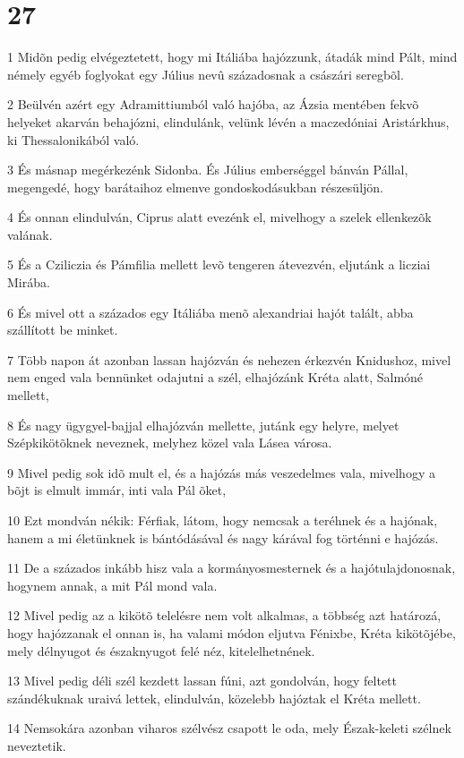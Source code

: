 \chapter{27}

\par 1 Midõn pedig elvégeztetett, hogy mi Itáliába hajózzunk, átadák mind Pált, mind némely egyéb foglyokat egy Július nevû századosnak a császári seregbõl.
\par 2 Beülvén azért egy Adramittiumból való hajóba, az Ázsia mentében fekvõ helyeket akarván behajózni, elindulánk, velünk lévén a maczedóniai Aristárkhus, ki Thessalonikából való.
\par 3 És másnap megérkezénk Sidonba. És Július emberséggel bánván Pállal, megengedé, hogy barátaihoz elmenve gondoskodásukban részesüljön.
\par 4 És onnan elindulván, Ciprus alatt evezénk el, mivelhogy a szelek ellenkezõk valának.
\par 5 És a Cziliczia és Pámfilia mellett levõ tengeren átevezvén, eljutánk a licziai Mirába.
\par 6 És mivel ott a százados egy Itáliába menõ alexandriai hajót talált, abba szállított be minket.
\par 7 Több napon át azonban lassan hajózván és nehezen érkezvén Knidushoz, mivel nem enged vala bennünket odajutni a szél, elhajózánk Kréta alatt, Salmóné mellett,
\par 8 És nagy ügygyel-bajjal elhajózván mellette, jutánk egy helyre, melyet Szépkikötõknek neveznek, melyhez közel vala Lásea városa.
\par 9 Mivel pedig sok idõ mult el, és a hajózás más veszedelmes vala, mivelhogy a bõjt is elmult immár, inti vala Pál õket,
\par 10 Ezt mondván nékik: Férfiak, látom, hogy nemcsak a teréhnek és a hajónak, hanem a mi életünknek is bántódásával és nagy kárával fog történni e hajózás.
\par 11 De a százados inkább hisz vala a kormányosmesternek és a hajótulajdonosnak, hogynem annak, a mit Pál mond vala.
\par 12 Mivel pedig az a kikötõ telelésre nem volt alkalmas, a többség azt határozá, hogy hajózzanak el onnan is, ha valami módon eljutva Fénixbe, Kréta kikötõjébe, mely délnyugot és északnyugot felé néz, kitelelhetnének.
\par 13 Mivel pedig déli szél kezdett lassan fúni, azt gondolván, hogy feltett szándékuknak uraivá lettek, elindulván, közelebb hajóztak el Kréta mellett.
\par 14 Nemsokára azonban viharos szélvész csapott le oda, mely Észak-keleti szélnek neveztetik.
